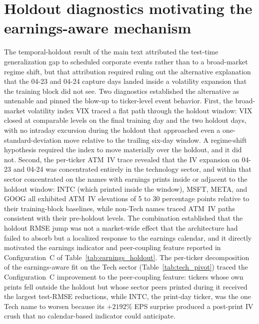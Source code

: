 \section{Holdout diagnostics motivating the earnings-aware mechanism}\label{sec:supp_earnings_diag}

The temporal-holdout result of the main text attributed the test-time generalization gap to scheduled corporate events rather than to a broad-market regime shift, but that attribution required ruling out the alternative explanation that the 04-23 and 04-24 capture days landed inside a volatility expansion that the training block did not see. Two diagnostics established the alternative as untenable and pinned the blow-up to ticker-level event behavior. First, the broad-market volatility index VIX traced a flat path through the holdout window: VIX closed at comparable levels on the final training day and the two holdout days, with no intraday excursion during the holdout that approached even a one-standard-deviation move relative to the trailing six-day window. A regime-shift hypothesis required the index to move materially over the holdout, and it did not. Second, the per-ticker ATM~IV trace revealed that the IV expansion on 04-23 and 04-24 was concentrated entirely in the technology sector, and within that sector concentrated on the names with earnings prints inside or adjacent to the holdout window: INTC (which printed inside the window), MSFT, META, and GOOG all exhibited ATM~IV elevations of 5 to 30 percentage points relative to their training-block baselines, while non-Tech names traced ATM~IV paths consistent with their pre-holdout levels. The combination established that the holdout RMSE jump was not a market-wide effect that the architecture had failed to absorb but a localized response to the earnings calendar, and it directly motivated the earnings indicator and peer-coupling feature reported in Configuration~C of Table~\ref{tab:earnings_holdout}. The per-ticker decomposition of the earnings-aware fit on the Tech sector (Table~\ref{tab:tech_pivot}) traced the Configuration~C improvement to the peer-coupling feature: tickers whose own prints fell outside the holdout but whose sector peers printed during it received the largest test-RMSE reductions, while INTC, the print-day ticker, was the one Tech name to worsen because its $+2192\%$ EPS surprise produced a post-print IV crush that no calendar-based indicator could anticipate.

